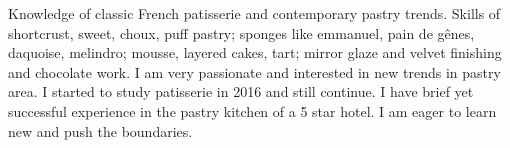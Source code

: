 

\begin{cvparagraph}

Knowledge of classic French patisserie and contemporary pastry trends. Skills of shortcrust, sweet, choux, puff pastry; sponges like emmanuel, pain de gênes, daquoise, melindro; mousse, layered cakes, tart; mirror glaze and velvet finishing and chocolate work. I am very passionate and interested in new trends in pastry area. I started to study patisserie in 2016 and still continue. I have brief yet successful experience in the pastry kitchen of a 5 star hotel. I am eager to learn new and push the boundaries.
\end{cvparagraph}
